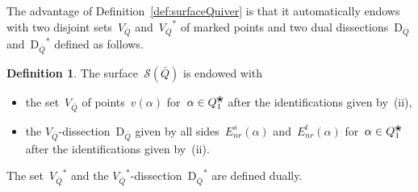 \documentclass{amsart}
\theoremstyle{definition}
\newtheorem{definition}[theorem]{Definition}
\newcommand{\blossom}{^\text{\ding{96}}} %
\newcommand{\Enrs}[1]{E_{nr}^{s}(#1)}
\newcommand{\Enrt}[1]{E_{nr}^{t}(#1)}
\newcommand{\surface}{\mathcal{S}} %
\newcommand{\dual}{^*} %
\newcommand{\dissection}{\mathrm{D}} %
\begin{document}
The advantage of Definition~\ref{def:surfaceQuiver} is that it automatically endows with two disjoint sets~$V_{\bar Q}$ and~${V_{\bar Q}}\dual$ of marked points and two dual dissections~$\dissection_{\bar Q}$ and~${\dissection_{\bar Q}}\dual$ defined as follows.

\begin{definition}
\label{def:dissectionQuiver}
The surface~$\surface(\bar Q)$ is endowed with
\begin{itemize}
\item the set~$V_{\bar Q}$ of points~$v(\alpha)$ for~$\alpha \in Q_1\blossom$ after the identifications given by~(ii),
\item the $V_{\bar Q}$-dissection~$\dissection_{\bar Q}$ given by all sides~$\Enrs{\alpha}$ and~$\Enrt{\alpha}$ for~$\alpha \in Q_1\blossom$ after the identifications given by~(ii).
\end{itemize}
The set~${V_{\bar Q}}\dual$ and the ${V_{\bar Q}}\dual$-dissection~${\dissection_{\bar Q}}\dual$ are defined dually.
\end{definition}
\end{document}
